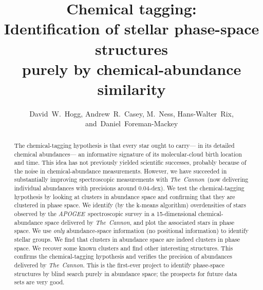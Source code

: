 \documentclass[12pt, letterpaper, preprint]{aastex}
\newcommand{\acronym}[1]{{\small{#1}}}
\newcommand{\project}[1]{\textsl{#1}}
\newcommand{\apogee}{\project{\acronym{APOGEE}}}
\newcommand{\thecannon}{\project{The~Cannon}}
\begin{document}
\sloppy\sloppypar

\title{Chemical tagging: \\
       Identification of stellar phase-space structures \\
       purely by chemical-abundance similarity}
\author{David~W.~Hogg,
        Andrew~R.~Casey,
        M.~Ness,
        Hans-Walter~Rix,
    and~Daniel~Foreman-Mackey}

\begin{abstract}
The chemical-tagging hypothesis is that every star ought to carry---%
in its detailed chemical abundances---%
an informative signature of its molecular-cloud birth location and time.
This idea has not previously yielded scientific successes, probably because of the
noise in chemical-abundance measurements.
However, we have succeeded in substantially improving spectroscopic measurements with \thecannon\ 
(now delivering individual abundances with precisions around 0.04-dex).
We test the chemical-tagging hypothesis by looking at clusters in abundance space
and confirming that they are clustered in phase space.
We identify (by the k-means algorithm) overdensities of stars observed by the \apogee\ spectroscopic survey
in a 15-dimensional chemical-abundance space delivered by \thecannon,
and plot the associated stars in phase space.
We use \emph{only} abundance-space information (no positional information) to identify stellar groups.
We find that clusters in abundance space are indeed clusters in phase space.
We recover some known clusters and find other interesting structures.
This confirms the chemical-tagging hypothesis and verifies the precision of abundances delivered by \thecannon.
This is the first-ever project to identify phase-space structures by blind search purely in abundance space;
the prospects for future data sets are very good.
\end{abstract}

\end{document}
